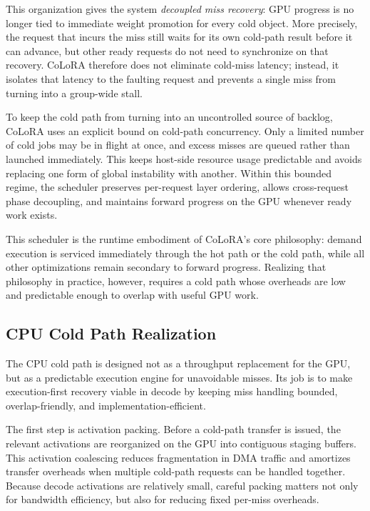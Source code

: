 \documentclass[sigplan,anonymous,review,nonacm]{acmart}
\begin{document}
This organization gives the system \emph{decoupled miss recovery}: GPU progress is no longer tied to immediate weight promotion for every cold object. More precisely, the request that incurs the miss still waits for its own cold-path result before it can advance, but other ready requests do not need to synchronize on that recovery. CoLoRA therefore does not eliminate cold-miss latency; instead, it isolates that latency to the faulting request and prevents a single miss from turning into a group-wide stall.

To keep the cold path from turning into an uncontrolled source of backlog, CoLoRA uses an explicit bound on cold-path concurrency. Only a limited number of cold jobs may be in flight at once, and excess misses are queued rather than launched immediately. This keeps host-side resource usage predictable and avoids replacing one form of global instability with another. Within this bounded regime, the scheduler preserves per-request layer ordering, allows cross-request phase decoupling, and maintains forward progress on the GPU whenever ready work exists.

This scheduler is the runtime embodiment of CoLoRA's core philosophy: demand execution is serviced immediately through the hot path or the cold path, while all other optimizations remain secondary to forward progress. Realizing that philosophy in practice, however, requires a cold path whose overheads are low and predictable enough to overlap with useful GPU work.

\subsection{CPU Cold Path Realization}
\label{subsec:cpu-cold-path}

The CPU cold path is designed not as a throughput replacement for the GPU, but as a predictable execution engine for unavoidable misses. Its job is to make execution-first recovery viable in decode by keeping miss handling bounded, overlap-friendly, and implementation-efficient.

The first step is activation packing. Before a cold-path transfer is issued, the relevant activations are reorganized on the GPU into contiguous staging buffers. This activation coalescing reduces fragmentation in DMA traffic and amortizes transfer overheads when multiple cold-path requests can be handled together. Because decode activations are relatively small, careful packing matters not only for bandwidth efficiency, but also for reducing fixed per-miss overheads.
\end{document}
